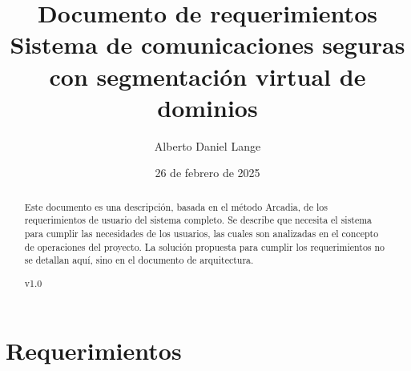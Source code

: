 \documentclass[12pt]{article}
\title{Documento de requerimientos \\
\large Sistema de comunicaciones seguras con segmentación virtual de dominios
}
\author{Alberto Daniel Lange}
\date{26 de febrero de 2025}
\begin{document}
\maketitle
\begin{abstract}
    Este documento es una descripción, basada en el método Arcadia, de los requerimientos de usuario del sistema completo. Se describe que necesita el sistema para cumplir las necesidades de los usuarios, las cuales son analizadas en el concepto de operaciones del proyecto. La solución propuesta para cumplir los requerimientos no se detallan aquí, sino en el documento de arquitectura.
    \begin{center}
        v1.0
    \end{center}
\end{abstract}
\tableofcontents
\newpage



\section{Requerimientos}
\end{document}
